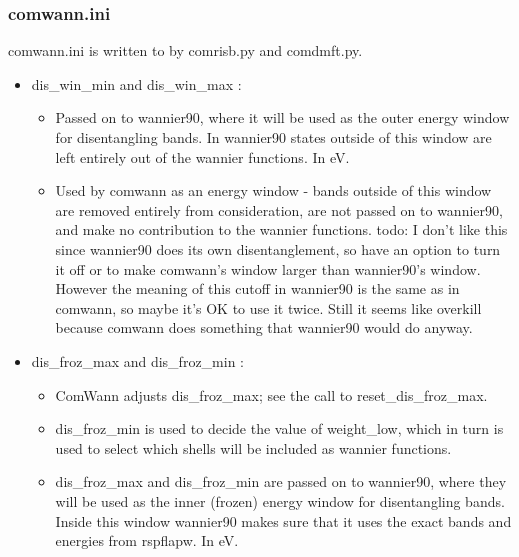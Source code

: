 \documentclass[aps,prb,singlecolumn,preprintnumbers,amsmath,amssymb]{revtex4}
\begin{document}
\subsubsection{comwann.ini}
comwann.ini is written to by comrisb.py and  comdmft.py.
\begin{itemize}
        \item dis\_win\_min and dis\_win\_max :
        \begin{itemize}
        \item Passed on to wannier90, where it will be used as the outer energy window for disentangling bands. In wannier90 states outside of this window are left entirely out of the wannier functions.   In eV. %
        \item        Used by comwann as an energy window - bands outside of this window are removed entirely from consideration, are not passed on to wannier90, and make no contribution to the wannier functions. todo: I don't like this since wannier90 does its own disentanglement, so have an option to turn it off or to make comwann's window larger than wannier90's window.  However the meaning of this cutoff in wannier90 is  the same as in comwann, so maybe it's OK to use it twice.  Still it seems like overkill because comwann does something that wannier90 would do anyway.
        \end{itemize}
\item dis\_froz\_max and dis\_froz\_min : 
        \begin{itemize}
        \item ComWann adjusts dis\_froz\_max; see the call to reset\_dis\_froz\_max.
        \item dis\_froz\_min is used to decide the value of weight\_low, which in turn is used to select which shells will be included as wannier functions.
        \item dis\_froz\_max and dis\_froz\_min are passed on to wannier90, where they will be used as the inner (frozen) energy window for disentangling bands.  Inside this window wannier90 makes sure that it uses the exact bands and energies from rspflapw. In eV.  %

\end{itemize}
\end{itemize}
\end{document}
